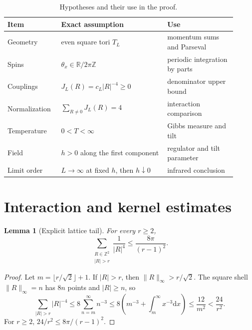 \documentclass[aps,prb,preprint,notitlepage,groupedaddress,amsmath,amssymb,
               superscriptaddress,nofootinbib,floatfix]{revtex4-2}
\theoremstyle{definition}
\theoremstyle{plain}
\newtheorem{lemma}{Lemma}
\newcommand{\dd}{\mathrm{d}}
\begin{document}
\begin{table}[h]
\caption{Hypotheses and their use in the proof.}
\label{tab:hypotheses}
\begin{ruledtabular}
\begin{tabular}{p{0.19\linewidth}p{0.43\linewidth}p{0.29\linewidth}}
Item & Exact assumption & Use\\
\hline
Geometry & even square tori $T_L$ & momentum sums and Parseval\\
Spins & $\theta_x\in\mathbb R/2\pi\mathbb Z$ & periodic integration by parts\\
Couplings & $J_L(R)=c_L|R|^{-4}\ge0$ & denominator upper bound\\
Normalization & $\sum_{R\ne0}J_L(R)=4$ & interaction comparison\\
Temperature & $0<T<\infty$ & Gibbs measure and tilt\\
Field & $h>0$ along the first component & regulator and tilt parameter\\
Limit order & $L\to\infty$ at fixed $h$, then $h\downarrow0$ & infrared conclusion\\
\end{tabular}
\end{ruledtabular}
\end{table}

\section{Interaction and kernel estimates}

\begin{lemma}[Explicit lattice tail]
For every $r\ge2$,
\begin{equation}
 \sum_{\substack{R\in\mathbb Z^2\\|R|>r}}\frac1{|R|^4}
 \le\frac{8\pi}{(r-1)^2}.
 \label{eq:tail}
\end{equation}
\end{lemma}

\begin{proof}
Let $m=\lfloor r/\sqrt2\rfloor+1$.  If $|R|>r$, then
$\|R\|_\infty>r/\sqrt2$.  The square shell $\|R\|_\infty=n$ has $8n$
points and $|R|\ge n$, so
\begin{equation}
 \sum_{|R|>r}|R|^{-4}
 \le8\sum_{n=m}^{\infty}n^{-3}
 \le8\left(m^{-3}+\int_m^\infty x^{-3}\dd x\right)
 \le\frac{12}{m^2}<\frac{24}{r^2}.
\end{equation}
For $r\ge2$, $24/r^2\le8\pi/(r-1)^2$.
\end{proof}
\end{document}
